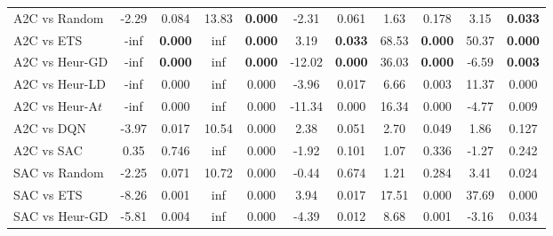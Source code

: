 \begin{tabular}{lcccccccccc}
	\midrule 
	A2C vs Random    & -2.29          & 0.084                  & 13.83          & \textbf{0.000}         & -2.31          & 0.061                  & 1.63           & 0.178                  & 3.15           & \textbf{0.033}         \\
	A2C vs ETS       & -inf           & \textbf{0.000}         & inf            & \textbf{0.000}         & 3.19           & \textbf{0.033}         & 68.53          & \textbf{0.000}         & 50.37          & \textbf{0.000}         \\
	A2C vs Heur-GD   & -inf           & \textbf{0.000}         & inf            & \textbf{0.000}         & -12.02         & \textbf{0.000}         & 36.03          & \textbf{0.000}         & -6.59          & \textbf{0.003}         \\
	A2C vs Heur-LD   & -inf           & 0.000                  & inf            & 0.000                  & -3.96          & 0.017                  & 6.66           & 0.003                  & 11.37          & 0.000                  \\
	A2C vs Heur-A$t$ & -inf           & 0.000                  & inf            & 0.000                  & -11.34         & 0.000                  & 16.34          & 0.000                  & -4.77          & 0.009                  \\
	A2C vs DQN       & -3.97          & 0.017                  & 10.54          & 0.000                  & 2.38           & 0.051                  & 2.70           & 0.049                  & 1.86           & 0.127                  \\
	A2C vs SAC       & 0.35           & 0.746                  & inf            & 0.000                  & -1.92          & 0.101                  & 1.07           & 0.336                  & -1.27          & 0.242                  \\
	\midrule 
	SAC vs Random    & -2.25          & 0.071                  & 10.72          & 0.000                  & -0.44          & 0.674                  & 1.21           & 0.284                  & 3.41           & 0.024                  \\
	SAC vs ETS       & -8.26          & 0.001                  & inf            & 0.000                  & 3.94           & 0.017                  & 17.51          & 0.000                  & 37.69          & 0.000                  \\
	SAC vs Heur-GD   & -5.81          & 0.004                  & inf            & 0.000                  & -4.39          & 0.012                  & 8.68           & 0.001                  & -3.16          & 0.034                  \\

\end{tabular}
